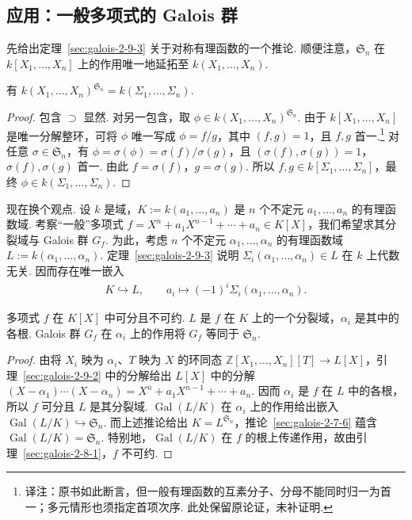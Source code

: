 \subsection{应用：一般多项式的 Galois 群}\label{sec:galois-2-9-5}
先给出定理~\ref{sec:galois-2-9-3} 关于对称有理函数的一个推论. 顺便注意，$\mathfrak S_n$ 在 $k[X_1,\ldots,X_n]$ 上的作用唯一地延拓至 $k(X_1,\ldots,X_n)$.
\begin{corollary*}有 $k(X_1,\ldots,X_n)^{\mathfrak S_n}=k(\Sigma_1,\ldots,\Sigma_n)$.\end{corollary*}
\begin{proof}包含 $\supset$ 显然. 对另一包含，取 $\phi\in k(X_1,\ldots,X_n)^{\mathfrak S_n}$. 由于 $k[X_1,\ldots,X_n]$ 是唯一分解整环，可将 $\phi$ 唯一写成 $\phi=f/g$，其中 $(f,g)=1$，且 $f,g$ 首一.\footnote{译注：原书如此断言，但一般有理函数的互素分子、分母不能同时归一为首一；多元情形也须指定首项次序. 此处保留原论证，未补证明.} 对任意 $\sigma\in\mathfrak S_n$，有 $\phi=\sigma(\phi)=\sigma(f)/\sigma(g)$，且 $(\sigma(f),\sigma(g))=1$，$\sigma(f),\sigma(g)$ 首一. 由此 $f=\sigma(f)$，$g=\sigma(g)$. 所以 $f,g\in k[\Sigma_1,\ldots,\Sigma_n]$，最终 $\phi\in k(\Sigma_1,\ldots,\Sigma_n)$.\end{proof}
现在换个观点. 设 $k$ 是域，$K:=k(a_1,\ldots,a_n)$ 是 $n$ 个不定元 $a_1,\ldots,a_n$ 的有理函数域. 考察``一般''多项式 $f=X^n+a_1X^{n-1}+\cdots+a_n\in K[X]$，我们希望求其分裂域与 Galois 群 $G_f$. 为此，考虑 $n$ 个不定元 $\alpha_1,\ldots,\alpha_n$ 的有理函数域 $L:=k(\alpha_1,\ldots,\alpha_n)$. 定理~\ref{sec:galois-2-9-3} 说明 $\Sigma_i(\alpha_1,\ldots,\alpha_n)\in L$ 在 $k$ 上代数无关. 因而存在唯一嵌入
\begin{align*}
K\hookrightarrow L,\qquad a_i\mapsto(-1)^i\Sigma_i(\alpha_1,\ldots,\alpha_n).
\end{align*}
\begin{theorem*}多项式 $f$ 在 $K[X]$ 中可分且不可约. $L$ 是 $f$ 在 $K$ 上的一个分裂域，$\alpha_i$ 是其中的各根. Galois 群 $G_f$ 在 $\alpha_i$ 上的作用将 $G_f$ 等同于 $\mathfrak S_n$.\end{theorem*}
\begin{proof}由将 $X_i$ 映为 $\alpha_i$、$T$ 映为 $X$ 的环同态 $\mathbb Z[X_1,\ldots,X_n][T]\to L[X]$，引理~\ref{sec:galois-2-9-2} 中的分解给出 $L[X]$ 中的分解 $(X-\alpha_1)\cdots(X-\alpha_n)=X^n+a_1X^{n-1}+\cdots+a_n$. 因而 $\alpha_i$ 是 $f$ 在 $L$ 中的各根，所以 $f$ 可分且 $L$ 是其分裂域. $\operatorname{Gal}(L/K)$ 在 $\alpha_i$ 上的作用给出嵌入 $\operatorname{Gal}(L/K)\hookrightarrow\mathfrak S_n$. 而上述推论给出 $K=L^{\mathfrak S_n}$，推论~\ref{sec:galois-2-7-6} 蕴含 $\operatorname{Gal}(L/K)=\mathfrak S_n$. 特别地，$\operatorname{Gal}(L/K)$ 在 $f$ 的根上传递作用，故由引理~\ref{sec:galois-2-8-1}，$f$ 不可约.\end{proof}
